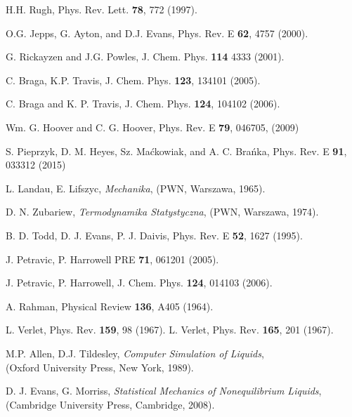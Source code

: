 \begin{thebibliography}{3}
%
\begin{spacing}{1.0}

 H.H. Rugh, Phys. Rev. Lett. {\bf 78}, 772 (1997).

 O.G. Jepps, G. Ayton, and D.J. Evans, Phys. Rev. E {\bf 62}, 4757 (2000).

 G. Rickayzen and J.G. Powles, J. Chem. Phys. {\bf 114} 4333 (2001).

 C. Braga, K.P. Travis, J. Chem. Phys. {\bf 123}, 134101 (2005).

 C. Braga and K. P. Travis, J. Chem. Phys. {\bf 124}, 104102 (2006).

 Wm. G. Hoover and C. G. Hoover, Phys. Rev. E {\bf 79}, 046705, (2009)

 S. Pieprzyk, D. M. Heyes, Sz. Maćkowiak, and A. C. Brańka, Phys. Rev. E {\bf 91}, 033312 (2015)

 L. Landau, E. Lifszyc, {\it Mechanika}, (PWN, Warszawa, 1965).

 D. N. Zubariew, {\it Termodynamika Statystyczna}, (PWN, Warszawa, 1974).

 B. D. Todd, D. J. Evans, P. J. Daivis, Phys. Rev. E {\bf 52}, 1627 (1995).

 J. Petravic, P. Harrowell PRE {\bf 71}, 061201 (2005).

 J. Petravic, P. Harrowell, J. Chem. Phys. {\bf 124}, 014103 (2006).

 A. Rahman, Physical Review {\bf 136}, A405 (1964).

 L. Verlet, Phys. Rev. {\bf 159}, 98 (1967).
 L. Verlet, Phys. Rev. {\bf 165}, 201 (1967).

 M.P. Allen, D.J. Tildesley, {\it Computer Simulation of Liquids}, \\(Oxford University Press, New York, 1989).

 D. J. Evans, G. Morriss, {\it Statistical Mechanics of Nonequilibrium Liquids}, \\(Cambridge University Press, Cambridge, 2008).


\end{spacing}
%
%



\end{thebibliography}